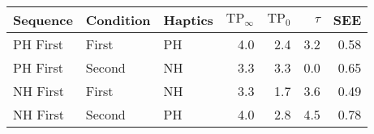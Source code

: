 \begin{tabular}{lllrrrr}
\toprule
 Sequence & Condition & Haptics &  $\mathrm{TP}_{\infty}$ &  $\mathrm{TP}_0$ &  $\tau$ &  SEE \\
\midrule
 PH First &  First  &  PH & 4.0 & 2.4 & 3.2 & 0.58 \\
 PH First &  Second &  NH & 3.3 & 3.3 & 0.0 & 0.65 \\
 NH First &  First  &  NH & 3.3 & 1.7 & 3.6 & 0.49 \\
 NH First &  Second &  PH & 4.0 & 2.8 & 4.5 & 0.78 \\
\bottomrule
\end{tabular}
